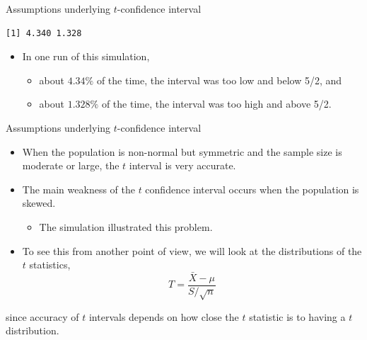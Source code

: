 \documentclass[
  ignorenonframetext,
]{beamer}
\providecommand{\tightlist}{%
  \setlength{\itemsep}{0pt}\setlength{\parskip}{0pt}}
\begin{document}
\begin{frame}[fragile]{Assumptions underlying \(t\)-confidence interval}
\begin{verbatim}
[1] 4.340 1.328
\end{verbatim}

\normalsize

\begin{itemize}
\item
  In one run of this simulation,

  \begin{itemize}
  \tightlist
  \item
    about \(4.34\%\) of the time, the interval was too low and below
    5/2, and
  \item
    about \(1.328\%\) of the time, the interval was too high and above
    5/2.
  \end{itemize}
\end{itemize}
\end{frame}

\begin{frame}{Assumptions underlying \(t\)-confidence interval}
\protect\hypertarget{assumptions-underlying-t-confidence-interval-4}{}
\begin{itemize}
\item
  When the population is non-normal but symmetric and the sample size is
  moderate or large, the \(t\) interval is very accurate.
\item
  The main weakness of the \(t\) confidence interval occurs when the
  population is skewed.

  \begin{itemize}
  \tightlist
  \item
    The simulation illustrated this problem.
  \end{itemize}
\item
  To see this from another point of view, we will look at the
  distributions of the \(t\) statistics,
  \[T=\frac{\bar{X}-\mu}{S/\sqrt{n}}\]
\end{itemize}

since accuracy of \(t\) intervals depends on how close the \(t\)
statistic is to having a \(t\) distribution.
\end{frame}
\end{document}
